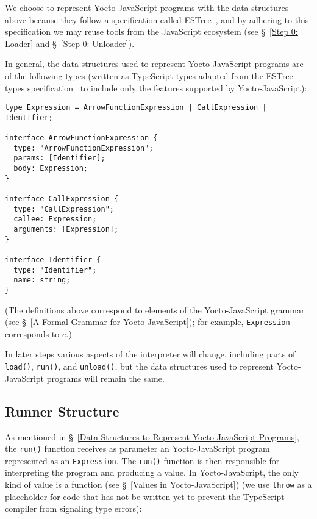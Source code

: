 \documentclass[12pt, oneside]{book}
\begin{document}
We choose to represent Yocto-JavaScript programs with the data structures above because they follow a specification called ESTree~\cite{estree}, and by adhering to this specification we may reuse tools from the JavaScript ecosystem (see §~\ref{Step 0: Loader} and §~\ref{Step 0: Unloader}).

In general, the data structures used to represent Yocto-JavaScript programs are of the following types (written as TypeScript types adapted from the ESTree types specification~\cite{estree-types} to include only the features supported by Yocto-JavaScript):

\begin{verbatim}
type Expression = ArrowFunctionExpression | CallExpression | Identifier;

interface ArrowFunctionExpression {
  type: "ArrowFunctionExpression";
  params: [Identifier];
  body: Expression;
}

interface CallExpression {
  type: "CallExpression";
  callee: Expression;
  arguments: [Expression];
}

interface Identifier {
  type: "Identifier";
  name: string;
}
\end{verbatim}

(The definitions above correspond to elements of the Yocto-JavaScript grammar (see §~\ref{A Formal Grammar for Yocto-JavaScript}); for example, \texttt{Expression} corresponds to $e$.)

In later steps various aspects of the interpreter will change, including parts of \texttt{load()}, \texttt{run()}, and \texttt{unload()}, but the data structures used to represent Yocto-JavaScript programs will remain the same.

\subsection{Runner Structure}
\label{Runner Structure}

As mentioned in §~\ref{Data Structures to Represent Yocto-JavaScript Programs}, the \texttt{run()} function receives as parameter an Yocto-JavaScript program represented as an \texttt{Expression}. The \texttt{run()} function is then responsible for interpreting the program and producing a value. In Yocto-JavaScript, the only kind of value is a function (see §~\ref{Values in Yocto-JavaScript}) (we use \texttt{throw} as a placeholder for code that has not be written yet to prevent the TypeScript compiler from signaling type errors):
\end{document}
